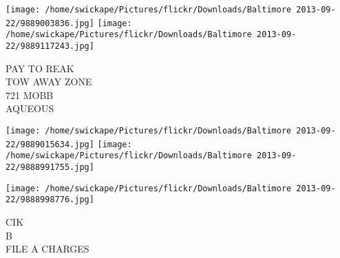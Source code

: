 \documentclass[10pt,letterpaper]{article}
\begin{document}
\texttt{[image: /home/swickape/Pictures/flickr/Downloads/Baltimore 2013-09-22/9889003836.jpg]}
\texttt{[image: /home/swickape/Pictures/flickr/Downloads/Baltimore 2013-09-22/9889117243.jpg]}

PAY TO REAK\\
TOW AWAY ZONE\\
721 MOBB\\
AQUEOUS\\
\pagebreak

\texttt{[image: /home/swickape/Pictures/flickr/Downloads/Baltimore 2013-09-22/9889015634.jpg]}
\texttt{[image: /home/swickape/Pictures/flickr/Downloads/Baltimore 2013-09-22/9888991755.jpg]}

\vspace{0.25in}
\texttt{[image: /home/swickape/Pictures/flickr/Downloads/Baltimore 2013-09-22/9888998776.jpg]}

CIK\\
B\\
FILE A CHARGES\\
\pagebreak
\end{document}
